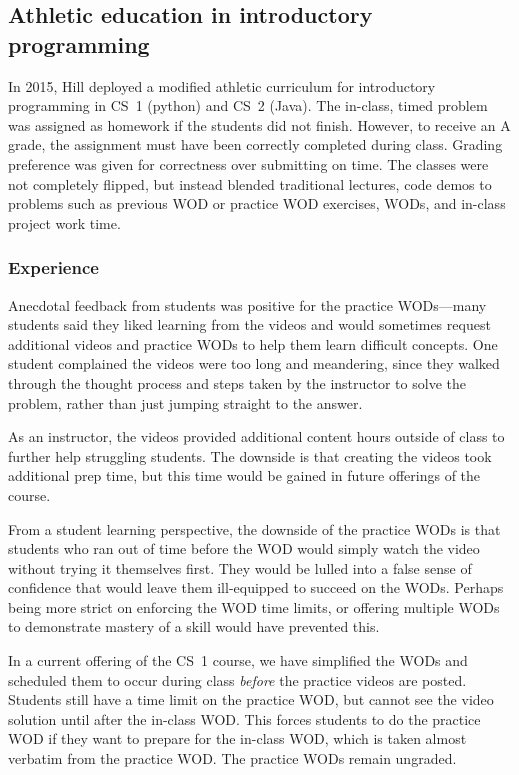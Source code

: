 \subsection{Athletic education in introductory programming}


In 2015, Hill deployed a modified athletic curriculum for introductory programming in CS~1 (python) and CS~2 (Java). The in-class, timed problem was assigned as homework if the students did not finish. However, to receive an A grade, the assignment must have been correctly completed during class. Grading preference was given for correctness over submitting on time.
%
The classes were not completely flipped, but instead blended traditional lectures, code demos to problems such as previous WOD or practice WOD exercises, WODs, and in-class project work time.

\subsubsection{Experience}

Anecdotal feedback from students was positive for the practice WODs---many students said they liked learning from the videos and would sometimes request additional videos and practice WODs to help them learn difficult concepts. One student complained the videos were too long and meandering, since they walked through the thought process and steps taken by the instructor to solve the problem, rather than just jumping straight to the answer.

As an instructor, the videos provided additional content hours outside of class to further help struggling students. The downside is that creating the videos took additional prep time, but this time would be gained in future offerings of the course.

From a student learning perspective, the downside of the practice WODs is that students who ran out of time before the WOD would simply watch the video without trying it themselves first. They would be lulled into a false sense of confidence that would leave them ill-equipped to succeed on the WODs. Perhaps being more strict on enforcing the WOD time limits, or offering multiple WODs to demonstrate mastery of a skill would have prevented this.

In a current offering of the CS~1 course, we have simplified the WODs and scheduled them to occur during class \emph{before} the practice videos are posted. Students still have a time limit on the practice WOD, but cannot see the video solution until after the in-class WOD. This forces students to do the practice WOD if they want to prepare for the in-class WOD, which is taken almost verbatim from the practice WOD. The practice WODs remain ungraded.

